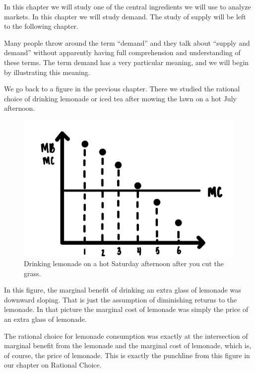 \documentclass[
]{book}
\begin{document}
In this chapter we will study one of the central ingredients we will use to analyze markets. In this chapter we will study demand. The study of supply will be left to the following chapter.

Many people throw around the term ``demand'' and they talk about ``supply and demand'' without apparently having full comprehension and understanding of these terms. The term demand has a very particular meaning, and we will begin by illustrating this meaning.

We go back to a figure in the previous chapter. There we studied the rational choice of drinking lemonade or iced tea after mowing the lawn on a hot July afternoon.

\begin{figure}

{\centering \includegraphics[width=0.5\linewidth]{img/rationalchoice/fig6} 

}

\caption{Drinking lemonade on a hot Saturday afternoon after you cut the grass.}\label{fig:demand01}
\end{figure}

In this figure, the marginal benefit of drinking an extra glass of lemonade was downward sloping. That is just the assumption of diminishing returns to the lemonade. In that picture the marginal cost of lemonade was simply the price of an extra glass of lemonade.

The rational choice for lemonade consumption was exactly at the intersection of marginal benefit from the lemonade and the marginal cost of lemonade, which is, of course, the price of lemonade. This is exactly the punchline from this figure in our chapter on Rational Choice.
\end{document}
